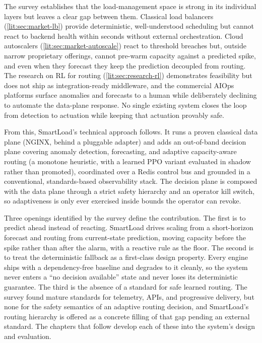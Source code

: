 The survey establishes that the load-management space is strong in its
individual layers but leaves a clear gap between them. Classical load balancers
(\cref{lit:sec:market-lb}) provide deterministic, well-understood scheduling but
cannot react to backend health within seconds without external orchestration.
Cloud autoscalers (\cref{lit:sec:market-autoscale}) react to threshold breaches
but, outside narrow proprietary offerings, cannot pre-warm capacity against a
predicted spike, and even when they forecast they keep the prediction decoupled
from routing. The research on RL for routing (\cref{lit:sec:research-rl})
demonstrates feasibility but does not ship as integration-ready middleware, and
the commercial AIOps platforms surface anomalies and forecasts to a human while
deliberately declining to automate the data-plane response. No single existing
system closes the loop from detection to actuation while keeping that actuation
provably safe.

From this, SmartLoad's technical approach follows. It runs a proven classical
data plane (NGINX, behind a pluggable adapter) and adds an out-of-band decision
plane covering anomaly detection, forecasting, and adaptive capacity-aware
routing (a monotone heuristic, with a learned PPO variant evaluated in shadow
rather than promoted), coordinated over a Redis control bus and grounded in a
conventional, standards-based observability stack. The decision plane is composed with the data plane through
a strict safety hierarchy and an operator kill switch, so adaptiveness is only
ever exercised inside bounds the operator can revoke.

Three openings identified by the survey define the contribution. The first is to
predict ahead instead of reacting. SmartLoad drives scaling from a short-horizon
forecast and routing from current-state prediction, moving capacity before the
spike rather than after the alarm, with a reactive rule as the floor. The second
is to treat the deterministic fallback as a first-class design property. Every
engine ships with a dependency-free baseline and degrades to it cleanly, so the
system never enters a ``no decision available'' state and never loses its
deterministic guarantee. The third is the absence of a standard for safe learned
routing. The survey found mature standards for telemetry, APIs, and progressive
delivery, but none for the safety semantics of an adaptive routing decision, and
SmartLoad's routing hierarchy is offered as a concrete filling of that gap
pending an external standard. The chapters that follow develop each of these
into the system's design and evaluation.
